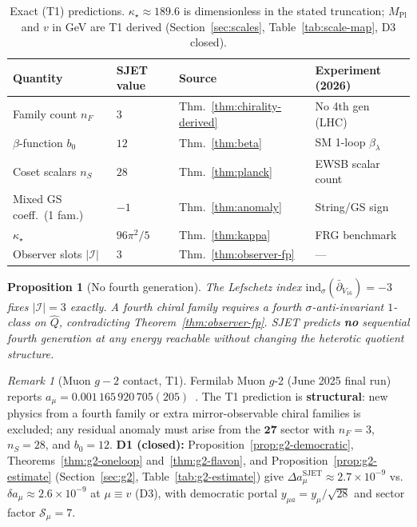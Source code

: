\documentclass[aps,prd,onecolumn,amsmath,amssymb,nofootinbib,11pt]{revtex4-2}
\numberwithin{equation}{section}
\theoremstyle{plain}
\newtheorem{proposition}[theorem]{Proposition}
\theoremstyle{definition}
\theoremstyle{remark}
\newtheorem{remark}[theorem]{Remark}
\newcommand{\MPl}{M_{\mathrm{Pl}}}
\begin{document}
\begin{table}[ht]
\centering
\small
\renewcommand{\arraystretch}{1.1}
\begin{tabular}{@{}llll@{}}
\toprule
\textbf{Quantity} & \textbf{SJET value} & \textbf{Source} & \textbf{Experiment (2026)} \\
\midrule
Family count $n_F$ & $3$ & Thm.~\ref{thm:chirality-derived} & No 4th gen (LHC) \\
$\beta$-function $b_0$ & $12$ & Thm.~\ref{thm:beta} & SM 1-loop $\beta_\lambda$ \\
Coset scalars $n_S$ & $28$ & Thm.~\ref{thm:planck} & EWSB scalar count \\
Mixed GS coeff.\ (1 fam.) & $-1$ & Thm.~\ref{thm:anomaly} & String/GS sign \\
$\kappa_\star$ & $96\pi^2/5$ & Thm.~\ref{thm:kappa} & FRG benchmark \\
Observer slots $|\mathcal{I}|$ & $3$ & Thm.~\ref{thm:observer-fp} & --- \\
\bottomrule
\end{tabular}
\caption{Exact (T1) predictions. $\kappa_\star\approx189.6$ is dimensionless in
the stated truncation; $\MPl$ and $v$ in GeV are T1 derived
(Section~\ref{sec:scales}, Table~\ref{tab:scale-map}, D3 closed).}
\label{tab:predictions-T1}
\end{table}

\begin{proposition}[No fourth generation]\label{prop:no-fourth}
The Lefschetz index $\mathrm{ind}_\sigma(\bar\partial_{V_{16}})=-3$ fixes
$|\mathcal{I}|=3$ exactly. A fourth chiral family requires a fourth
$\sigma$-anti-invariant $1$-class on $\hat Q$, contradicting
Theorem~\ref{thm:observer-fp}. SJET predicts \textbf{no} sequential fourth
generation at any energy reachable without changing the heterotic quotient
structure.
\end{proposition}

\begin{remark}[Muon $g-2$ contact, T1]
Fermilab Muon $g$-2 (June 2025 final run) reports
$a_\mu=0.001\,165\,920\,705(205)$~\cite{MuonG2FNAL2025}.
The T1 prediction is \textbf{structural}: new physics from a fourth family or
extra mirror-observable chiral families is excluded; any residual anomaly must
arise from the $\mathbf{27}$ sector with $n_F=3$, $n_S=28$, and $b_0=12$.
\textbf{D1 (closed):} Proposition~\ref{prop:g2-democratic},
Theorems~\ref{thm:g2-oneloop} and~\ref{thm:g2-flavon}, and
Proposition~\ref{prop:g2-estimate} (Section~\ref{sec:g2},
Table~\ref{tab:g2-estimate}) give
$\Delta a_\mu^{\mathrm{SJET}}\approx2.7\times10^{-9}$ vs.\
$\delta a_\mu\approx2.6\times10^{-9}$ at $\mu\equiv v$ (D3), with democratic
portal $y_{\mu a}=y_\mu/\sqrt{28}$ and sector factor $\mathcal{S}_\mu=7$.
\end{remark}
\end{document}
